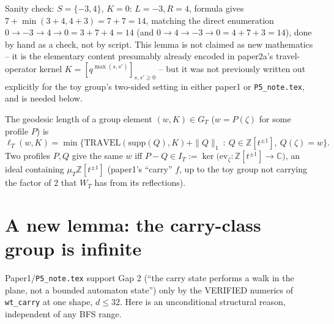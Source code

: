 \documentclass[11pt]{article}
\theoremstyle{remark}
\newcommand{\Z}{\mathbb Z}
\newcommand{\C}{\mathbb C}
\begin{document}
\noindent Sanity check: $S=\{-3,4\}$, $K=0$: $L=-3,R=4$, formula gives
$7+\min(3+4,4+3)=7+7=14$, matching the direct enumeration $0\to-3\to4\to0=3+7+4=14$ (and
$0\to4\to-3\to0=4+7+3=14$), done by hand as a check, not by script. This lemma is not claimed as new
mathematics -- it is the elementary content presumably already encoded in paper2a's travel-operator
kernel $K=[q^{\max(s,s')}]_{s,s'\ge0}$ -- but it was not previously written out explicitly for the toy
group's two-sided setting in either paper1 or \texttt{P5\_note.tex}, and is needed below.

The geodesic length of a group element $(w,K)\in G_T$ ($w=P(\zeta)$ for some profile $P$) is
\[
\ell_T(w,K) = \min\bigl\{\mathrm{TRAVEL}(\mathrm{supp}(Q),K)+\|Q\|_1 \ :\ Q\in\Z[t^{\pm1}],\ Q(\zeta)=w \bigr\}.
\]
Two profiles $P,Q$ give the same $w$ iff $P-Q\in I_T:=\ker\bigl(\mathrm{ev}_\zeta:\Z[t^{\pm1}]\to\C\bigr)$,
an ideal containing $\mu_T\Z[t^{\pm1}]$ (paper1's ``carry'' $f$, up to the toy group not carrying the
factor of $2$ that $W_T$ has from its reflections).

\section{A new lemma: the carry-class group is infinite}\label{sec:infinite}

Paper1/\texttt{P5\_note.tex} support Gap 2 (``the carry state performs a walk in the plane, not a
bounded automaton state'') only by the VERIFIED numerics of \texttt{wt\_carry} at one shape,
$d\le32$. Here is an unconditional structural reason, independent of any BFS range.
\end{document}
